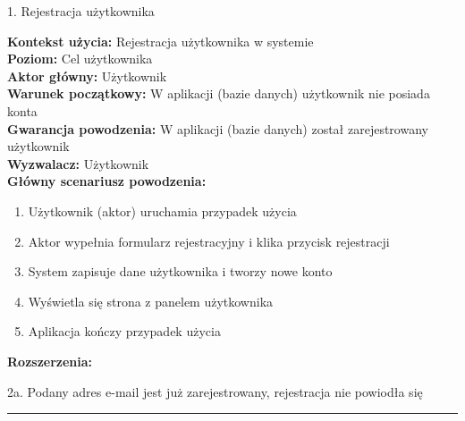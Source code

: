 {\noindent \bf{\small 1. Rejestracja użytkownika\par}}
\vspace{0.5cm}
{\noindent \bf Kontekst użycia: } Rejestracja użytkownika w systemie\\
{\bf Poziom: } Cel użytkownika\\
{\bf Aktor główny: } Użytkownik\\
{\bf Warunek początkowy: } W aplikacji (bazie danych) użytkownik nie posiada konta\\
{\bf Gwarancja powodzenia: } W aplikacji (bazie danych) został zarejestrowany użytkownik\\
{\bf Wyzwalacz: } Użytkownik\\
{\bf Główny scenariusz powodzenia: }
\begin{center}
    \begin{enumerate}
        \item Użytkownik (aktor) uruchamia przypadek użycia
        \item Aktor wypełnia formularz rejestracyjny i klika przycisk rejestracji
        \item System zapisuje dane użytkownika i tworzy nowe konto
        \item Wyświetla się strona z panelem użytkownika
        \item Aplikacja kończy przypadek użycia
    \end{enumerate}
\end{center}
{\noindent \bf Rozszerzenia: }
\begin{center}
    \begin{description}
        \item{2a.} Podany adres e-mail jest już zarejestrowany, rejestracja nie powiodła się
    \end{description}
\end{center}

\noindent\rule{14cm}{0.1pt} %

